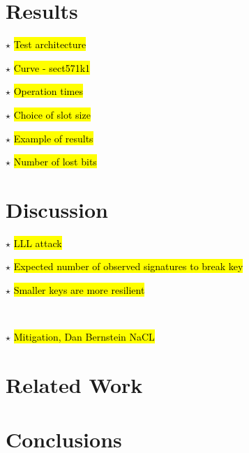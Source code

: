 \documentclass{llncs}
\newcommand{\starpar}[1]{\par{\footnotesize $\star$ \hl{#1}\par}}
\begin{document}
\section{Results}\label{sec:results}

\starpar{Test architecture}
\starpar{Curve - sect571k1}
\starpar{Operation times}
\starpar{Choice of slot size}
\starpar{Example of results}
\starpar{Number of lost bits}
\section{Discussion}\label{sec:discussion}
\starpar{LLL attack}
\starpar{Expected number of observed signatures to break key}
\starpar{Smaller keys are more resilient}~\cite{walter04longer}
\starpar{Mitigation, Dan Bernstein NaCL}
\section{Related Work}\label{sec:related}
\section{Conclusions}




\end{document}
